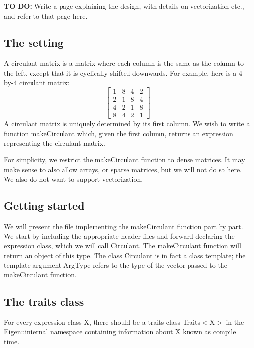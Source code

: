 {\bfseries TO} {\bfseries DO\+:} Write a page explaining the design, with details on vectorization etc., and refer to that page here.\hypertarget{_topic_new_expression_type_TopicSetting}{}\subsection{The setting}\label{_topic_new_expression_type_TopicSetting}
A circulant matrix is a matrix where each column is the same as the column to the left, except that it is cyclically shifted downwards. For example, here is a 4-\/by-\/4 circulant matrix\+: \[ \begin{bmatrix} 1 & 8 & 4 & 2 \\ 2 & 1 & 8 & 4 \\ 4 & 2 & 1 & 8 \\ 8 & 4 & 2 & 1 \end{bmatrix} \] A circulant matrix is uniquely determined by its first column. We wish to write a function {\ttfamily make\+Circulant} which, given the first column, returns an expression representing the circulant matrix.

For simplicity, we restrict the {\ttfamily make\+Circulant} function to dense matrices. It may make sense to also allow arrays, or sparse matrices, but we will not do so here. We also do not want to support vectorization.\hypertarget{_topic_new_expression_type_TopicPreamble}{}\subsection{Getting started}\label{_topic_new_expression_type_TopicPreamble}
We will present the file implementing the {\ttfamily make\+Circulant} function part by part. We start by including the appropriate header files and forward declaring the expression class, which we will call {\ttfamily Circulant}. The {\ttfamily make\+Circulant} function will return an object of this type. The class {\ttfamily Circulant} is in fact a class template; the template argument {\ttfamily Arg\+Type} refers to the type of the vector passed to the {\ttfamily make\+Circulant} function.


\begin{DoxyCodeInclude}
\end{DoxyCodeInclude}
\hypertarget{_topic_new_expression_type_TopicTraits}{}\subsection{The traits class}\label{_topic_new_expression_type_TopicTraits}
For every expression class {\ttfamily X}, there should be a traits class {\ttfamily Traits$<$\+X$>$} in the {\ttfamily \hyperlink{namespace_eigen_1_1internal}{Eigen\+::internal}} namespace containing information about {\ttfamily X} known as compile time.

